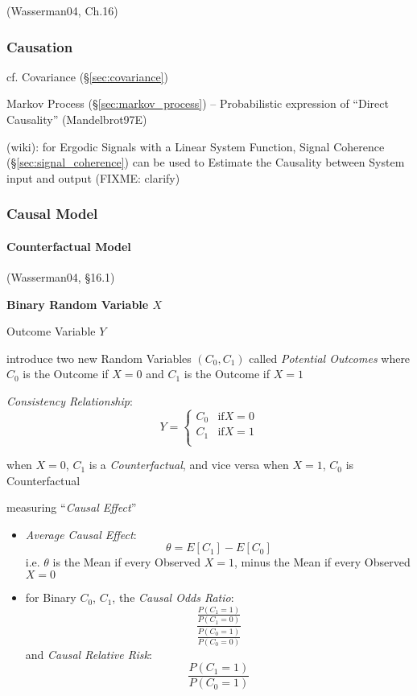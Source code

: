 (Wasserman04, Ch.16)



\subsubsection{Causation}\label{sec:causation}


cf. Covariance (\S\ref{sec:covariance})

Markov Process (\S\ref{sec:markov_process}) -- Probabilistic expression of
``Direct Causality'' (Mandelbrot97E)

\fist (wiki): for Ergodic Signals with a Linear System Function, Signal
Coherence (\S\ref{sec:signal_coherence}) can be used to Estimate the Causality
between System input and output (FIXME: clarify)



\subsubsection{Causal Model}\label{sec:causal_model}




\paragraph{Counterfactual Model}\label{sec:counterfactual}\hfill

(Wasserman04, \S16.1)

\textbf{Binary Random Variable $X$}

Outcome Variable $Y$

introduce two new Random Variables $(C_0, C_1)$ called \emph{Potential Outcomes}
where $C_0$ is the Outcome if $X = 0$ and $C_1$ is the Outcome if $X = 1$

\emph{Consistency Relationship}:
\[
  Y = \begin{cases}
    C_0 & \text{if} X = 0 \\
    C_1 & \text{if} X = 1 \\
  \end{cases}
\]

when $X = 0$, $C_1$ is a \emph{Counterfactual}, and vice versa when $X = 1$,
$C_0$ is Counterfactual

measuring ``\emph{Causal Effect}''

\begin{itemize}
  \item \emph{Average Causal Effect}:
    \[
      \theta = E[C_1] - E[C_0]
    \]
    i.e. $\theta$ is the Mean if every Observed $X = 1$, minus the Mean if every
    Observed $X = 0$

  \item for Binary $C_0$, $C_1$, the \emph{Causal Odds Ratio}:
    \[
      \frac{
        \frac{P(C_1 = 1)}{P(C_1 = 0)}
      }{
        \frac{P(C_0 = 1)}{P(C_0 = 0)}
      }
    \]
    and \emph{Causal Relative Risk}:
    \[
      \frac{P(C_1 = 1)}{P(C_0 = 1)}
    \]
\end{itemize}

